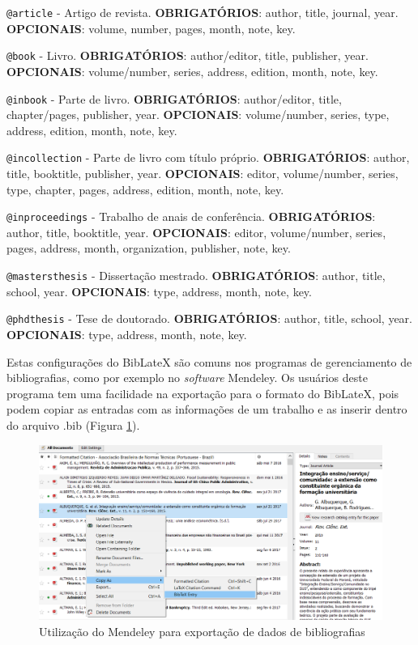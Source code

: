 \documentclass[12pt,brazil,oneside]{book}
\begin{document}
\texttt{@article} - Artigo de revista. \textbf{OBRIGATÓRIOS}: author, title, journal, year. \textbf{OPCIONAIS}: volume, number, pages, month, note, key.

\texttt{@book} - Livro. \textbf{OBRIGATÓRIOS}: author/editor, title, publisher, year.
\textbf{OPCIONAIS}: volume/number, series, address, edition, month, note, key.

\texttt{@inbook} - Parte de livro. \textbf{OBRIGATÓRIOS}: author/editor, title, chapter/pages, publisher, year. \textbf{OPCIONAIS}: volume/number, series, type, address, edition, month, note, key.

\texttt{@incollection} - Parte de livro com título próprio. \textbf{OBRIGATÓRIOS}: author, title, booktitle, publisher, year. \textbf{OPCIONAIS}: editor, volume/number, series, type, chapter, pages, address, edition, month, note, key.

\texttt{@inproceedings} - Trabalho de anais de conferência. \textbf{OBRIGATÓRIOS}: author, title, booktitle, year. \textbf{OPCIONAIS}: editor, volume/number, series, pages, address, month, organization, publisher, note, key.

\texttt{@mastersthesis} - Dissertação mestrado. \textbf{OBRIGATÓRIOS}: author, title, school, year. \textbf{OPCIONAIS}: type, address, month, note, key.

\texttt{@phdthesis} - Tese de doutorado. \textbf{OBRIGATÓRIOS}: author, title, school, year. \textbf{OPCIONAIS}: type, address, month, note, key.

Estas configurações do BibLateX são comuns nos programas de gerenciamento de bibliografias, como por exemplo no \emph{software} Mendeley. Os usuários deste programa tem uma facilidade na exportação para o formato do BibLateX, pois podem copiar as entradas com as informações de um trabalho e as inserir dentro do arquivo .bib (Figura \ref{fig:rmarkmendeley}).

\begin{figure}[H]

{\centering \includegraphics[width=0.7\linewidth]{rmarkmendeley} 

}

\caption{Utilização do Mendeley para exportação de dados de bibliografias}\label{fig:rmarkmendeley}
\end{figure}
\end{document}
